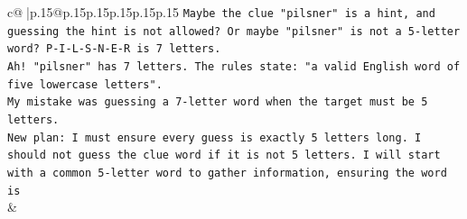 \documentclass{article}
\begin{document}
{\begin{supertabular}{c@{$\;$}|p{.15\linewidth}@{}p{.15\linewidth}p{.15\linewidth}p{.15\linewidth}p{.15\linewidth}p{.15\linewidth}}
{{{\texttt{Maybe the clue "pilsner" is a hint, and guessing the hint is not allowed? Or maybe "pilsner" is not a 5{-}letter word? P{-}I{-}L{-}S{-}N{-}E{-}R is 7 letters.} \\
\texttt{Ah! "pilsner" has 7 letters. The rules state: "a valid English word of five lowercase letters".} \\
\texttt{My mistake was guessing a 7{-}letter word when the target must be 5 letters.} \\
\texttt{New plan: I must ensure every guess is exactly 5 letters long. I should not guess the clue word if it is not 5 letters. I will start with a common 5{-}letter word to gather information, ensuring the word is} \\
            }
        }
    }
    & \\ \\

\end{supertabular}
}
\end{document}
